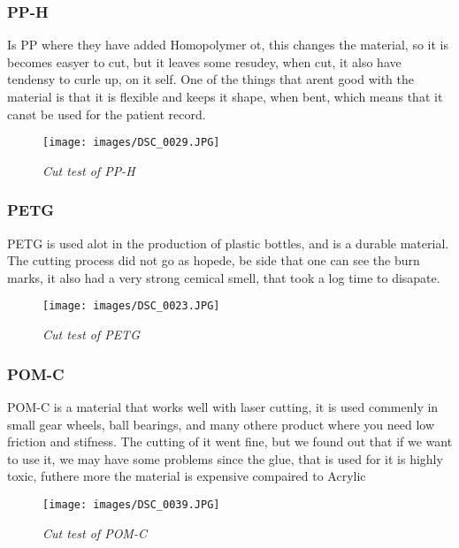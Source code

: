 \subsubsection{PP-H}
Is PP where they have added Homopolymer ot, this changes the material, so it is becomes easyer to cut, but it leaves some resudey, when cut, it also have tendensy to curle up, on it self.
One of the things that arent good with the material is that it is flexible and keeps it shape, when bent, which means that it canøt be used for the patient record. 
\begin{figure}[h]
	\begin{center}
		\texttt{[image: images/DSC\_0029.JPG]}
		\caption{\small {\it {Cut test of PP-H}}} \label{fig:explode}
	\end{center}
\end{figure}

\subsubsection{PETG}
PETG is used alot in the production of plastic bottles, and is a durable material.
The cutting process did not go as hopede, be side that one can see the burn marks, it also had a very strong cemical smell, that took a log time to disapate.
\begin{figure}[h]
	\begin{center}
		\texttt{[image: images/DSC\_0023.JPG]}
		\caption{\small {\it {Cut test of PETG}}} \label{fig:explode}
	\end{center}
\end{figure}
\subsubsection{POM-C}
POM-C is a material that works well with laser cutting, it is used commenly in small gear wheels, ball bearings, and many othere product where you need low friction and stifness.
The cutting of it went fine, but we found out that if we want to use it, we may have some problems since the glue, that is used for it is highly toxic, futhere more the material is expensive compaired to Acrylic
\begin{figure}[h]
	\begin{center}
		\texttt{[image: images/DSC\_0039.JPG]}
		\caption{\small {\it {Cut test of POM-C}}} \label{fig:explode}
	\end{center}
\end{figure}

